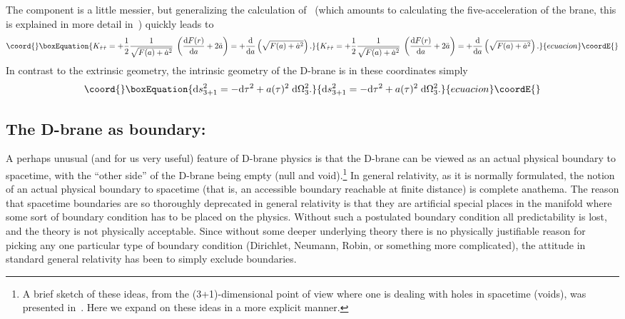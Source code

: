 \documentclass[a4paper,12pt]{article}
\begin{document}
%
The \myHighlight{$\tau\tau$}\coordHE{} component is a little messier, but generalizing the
calculation of~\cite{Surgery} (which amounts to calculating the
five-acceleration of the brane, this is explained in more detail
in~\cite{Book}) quickly leads to
%
\begin{equation}\coord{}\boxEquation{
K_{\hat{\tau}\hat{\tau}} 
= + \half  {1\over\sqrt{F(a)+\dot a^2}} \; 
\left({\d F(r)\over\d a} + 2 \ddot a \right)
= + {\d\over\d a} \left(\sqrt{F(a)+\dot a^2}\right) .
}{
K_{\hat{\tau}\hat{\tau}} 
= + \half  {1\over\sqrt{F(a)+\dot a^2}} \; 
\left({\d F(r)\over\d a} + 2 \ddot a \right)
= + {\d\over\d a} \left(\sqrt{F(a)+\dot a^2}\right) .
}{ecuacion}\coordE{}\end{equation}
%
In contrast to the extrinsic geometry, the intrinsic geometry of the
D-brane is in these coordinates simply
%
\begin{equation}\coord{}\boxEquation{
\d s^2_{3+1} = - \d\tau^2 + a(\tau)^2  \; \d\Omega_3^2.
}{
\d s^2_{3+1} = - \d\tau^2 + a(\tau)^2  \; \d\Omega_3^2.
}{ecuacion}\coordE{}\end{equation}
%

\subsection{The D-brane as boundary:}

A perhaps unusual (and for us very useful) feature of D-brane physics
is that the D-brane can be viewed as an actual physical boundary to
spacetime, with the ``other side'' of the D-brane being empty (null and
void).\footnote{
A brief sketch of these ideas, from the (3+1)-dimensional point of
view where one is dealing with holes in spacetime (voids), was
presented in~\cite{Brane-surgery}. Here we expand on these ideas in a
more explicit manner.}
In general relativity, as it is normally formulated, the notion of an
actual physical boundary to spacetime (that is, an accessible boundary
reachable at finite distance) is complete anathema. The reason that
spacetime boundaries are so thoroughly deprecated in general
relativity is that they are artificial special places in the manifold
where some sort of boundary condition has to be placed on the
physics. Without such a postulated boundary condition all
predictability is lost, and the theory is not physically
acceptable. Since without some deeper underlying theory there is no
physically justifiable reason for picking any one particular type of
boundary condition (Dirichlet, Neumann, Robin, or something more
complicated), the attitude in standard general relativity has been to
simply exclude boundaries.
\end{document}
